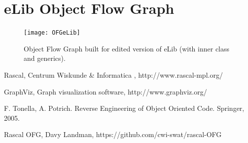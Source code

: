 \documentclass[a4paper,11pt]{article}
\begin{document}
	\appendix
	\section{eLib Object Flow Graph}
	
		\begin{figure}[h!]
			\centering
			\texttt{[image: OFGeLib]}
			\caption{Object Flow Graph built for edited version of eLib (with inner class and generics).}
			\label{fig:ofgelib}
		\end{figure}

	\begin{thebibliography}{9}
			Rascal, Centrum Wiskunde \& Informatica , http://www.rascal-mpl.org/

			GraphViz, Graph visualization software, http://www.graphviz.org/

			F. Tonella, A. Potrich. 
			Reverse Engineering of Object Oriented Code.
			Springer,
			2005.
			
			Rascal OFG, Davy Landman, https://github.com/cwi-swat/rascal-OFG
		
	\end{thebibliography}
\end{document}
